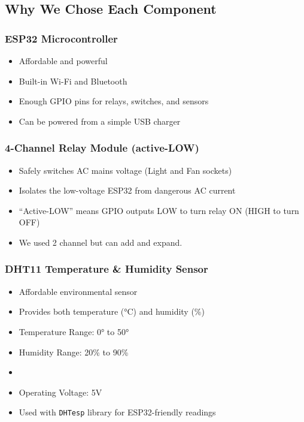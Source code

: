 \documentclass[12pt,a4paper]{article}
\begin{document}
\subsection{Why We Chose Each Component}

\subsubsection{ESP32 Microcontroller}
\begin{itemize}
\item Affordable and powerful
\item Built-in Wi-Fi and Bluetooth
\item Enough GPIO pins for relays, switches, and sensors
\item Can be powered from a simple USB charger
\end{itemize}

\subsubsection{4-Channel Relay Module (active-LOW)}
\begin{itemize}
\item Safely switches AC mains voltage (Light and Fan sockets)
\item Isolates the low-voltage ESP32 from dangerous AC current
\item ``Active-LOW'' means GPIO outputs LOW to turn relay ON (HIGH to turn OFF)
\item We used 2 channel but can add and expand.
\end{itemize}

\subsubsection{DHT11 Temperature \& Humidity Sensor}
\begin{itemize}
\item Affordable environmental sensor
\item Provides both temperature (°C) and humidity (\%)
\item Temperature Range: 0° to 50°
\item Humidity Range: 20\% to 90\%
\item 
\item Operating Voltage: 5V
\item Used with \texttt{DHTesp} library for ESP32-friendly readings
\end{itemize}
\end{document}
